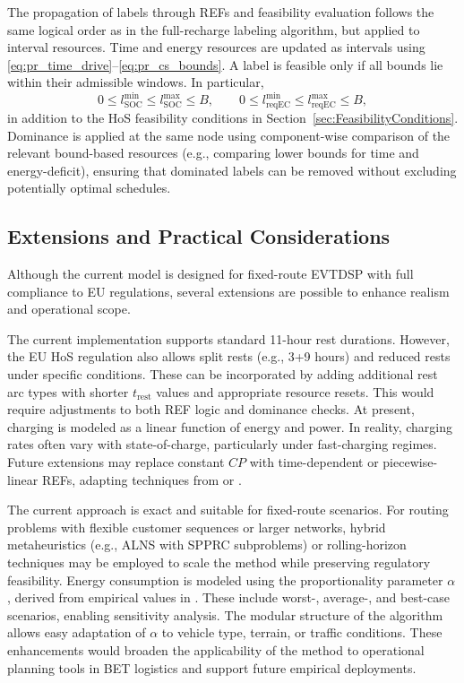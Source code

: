 \documentclass[trsc,dblanonrev]{informs4}
\begin{document}
The propagation of labels through REFs and feasibility evaluation follows the same logical order as in the full-recharge labeling algorithm, but applied to interval resources. Time and energy resources are updated as intervals using \eqref{eq:pr_time_drive}--\eqref{eq:pr_cs_bounds}. A label is feasible only if all bounds lie within their admissible windows. In particular,
\begin{equation}
0 \le l_{\text{SOC}}^{\min} \le l_{\text{SOC}}^{\max} \le B,
\qquad
0 \le l_{\text{reqEC}}^{\min} \le l_{\text{reqEC}}^{\max} \le B,
\label{eq:pr_feas}
\end{equation}
in addition to the HoS feasibility conditions in Section~\ref{sec:FeasibilityConditions}. Dominance is applied at the same node using component-wise comparison of the relevant bound-based resources (e.g., comparing lower bounds for time and energy-deficit), ensuring that dominated labels can be removed without excluding potentially optimal schedules.

\subsection{Extensions and Practical Considerations}

Although the current model is designed for fixed-route EVTDSP with full compliance to EU regulations, several extensions are possible to enhance realism and operational scope.

The current implementation supports standard 11-hour rest durations. However, the EU HoS regulation also allows split rests (e.g., 3+9 hours) and reduced rests under specific conditions. These can be incorporated by adding additional rest arc types with shorter \( t_{\text{rest}} \) values and appropriate resource resets. This would require adjustments to both REF logic and dominance checks. At present, charging is modeled as a linear function of energy and power. In reality, charging rates often vary with state-of-charge, particularly under fast-charging regimes. Future extensions may replace constant \( CP \) with time-dependent or piecewise-linear REFs, adapting techniques from \citet{montoya2017electric} or \citet{froger2019improved}.

The current approach is exact and suitable for fixed-route scenarios. For routing problems with flexible customer sequences or larger networks, hybrid metaheuristics (e.g., ALNS with SPPRC subproblems) or rolling-horizon techniques may be employed to scale the method while preserving regulatory feasibility. Energy consumption is modeled using the proportionality parameter \( \alpha \), derived from empirical values in \citet{schneider2023novel}. These include worst-, average-, and best-case scenarios, enabling sensitivity analysis. The modular structure of the algorithm allows easy adaptation of \( \alpha \) to vehicle type, terrain, or traffic conditions. These enhancements would broaden the applicability of the method to operational planning tools in BET logistics and support future empirical deployments.
\end{document}

